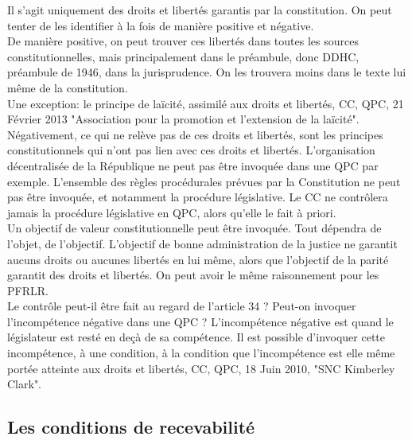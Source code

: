 \documentclass[10pt, a4paper, openany]{book}
\begin{document}
Il s'agit uniquement des droits et libertés garantis par la constitution. On peut tenter de les identifier à la fois de manière positive et négative. \\
De manière positive, on peut trouver ces libertés dans toutes les sources constitutionnelles, mais principalement dans le préambule, donc DDHC, préambule de 1946, dans la jurisprudence. On les trouvera moins dans le texte lui même de la constitution. \\
Une exception: le principe de laïcité, assimilé aux droits et libertés, CC, QPC, 21 Février 2013 "Association pour la promotion et l'extension de la laïcité". \\
Négativement, ce qui ne relève pas de ces droits et libertés, sont les principes constitutionnels qui n'ont pas lien avec ces droits et libertés. L'organisation décentralisée de la République ne peut pas être invoquée dans une QPC par exemple. L'ensemble des règles procédurales prévues par la Constitution ne peut pas être invoquée, et notamment la procédure législative. Le CC ne contrôlera jamais la procédure législative en QPC, alors qu'elle le fait à priori. \\
Un objectif de valeur constitutionnelle peut être invoquée. Tout dépendra de l'objet, de l'objectif. L'objectif de bonne administration de la justice ne garantit aucuns droits ou aucunes libertés en lui même, alors que l'objectif de la parité garantit des droits et libertés. On peut avoir le même raisonnement pour les PFRLR. \\
Le contrôle peut-il être fait au regard de l'article 34 ? Peut-on invoquer l'incompétence négative dans une QPC ? L'incompétence négative est quand le législateur est resté en deçà de sa compétence. Il est possible d'invoquer cette incompétence, à une condition, à la condition que l'incompétence est elle même portée atteinte aux droits et libertés, CC, QPC, 18 Juin 2010, "SNC Kimberley Clark". 

\subsection{Les conditions de recevabilité}
\end{document}
